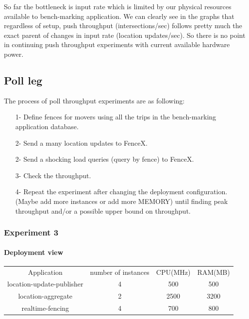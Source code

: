 \documentclass[a4]{report}
\begin{document}
    So far the bottleneck is input rate which is limited by our physical resources available to bench-marking
    application.
    We can clearly see in the graphs that regardless of setup, push throughput (intersections/sec) follows pretty
    much the exact parent of changes in input rate (location updates/sec).
    So there is no point in continuing push throughput experiments with current available hardware power.

    \subsection{Poll leg}
    The process of poll throughput experiments are as following:
    \begin{itemize}
        \item[1-] Define fences for movers using all the trips in the bench-marking application database.
        \item[2-] Send a many location updates to FenceX.
        \item[2-] Send a shocking load queries (query by fence) to FenceX.
        \item[3-] Check the throughput.
        \item[4-] Repeat the experiment after changing the deployment configuration. (Maybe add more instances or add
        more MEMORY) until finding peak throughput and/or a possible upper bound on throughput.
    \end{itemize}

    \subsubsection{Experiment 3}

    \paragraph{Deployment view}
    \begin{center}
        \begin{tabular}{ c c c c }
            Application               & number of instances & CPU(MHz) & RAM(MB) \\
            location-update-publisher & 4                   & 500      & 500     \\
            location-aggregate        & 2                   & 2500     & 3200    \\
            realtime-fencing          & 4                   & 700      & 800     \\
        \end{tabular}
    \end{center}
\end{document}
